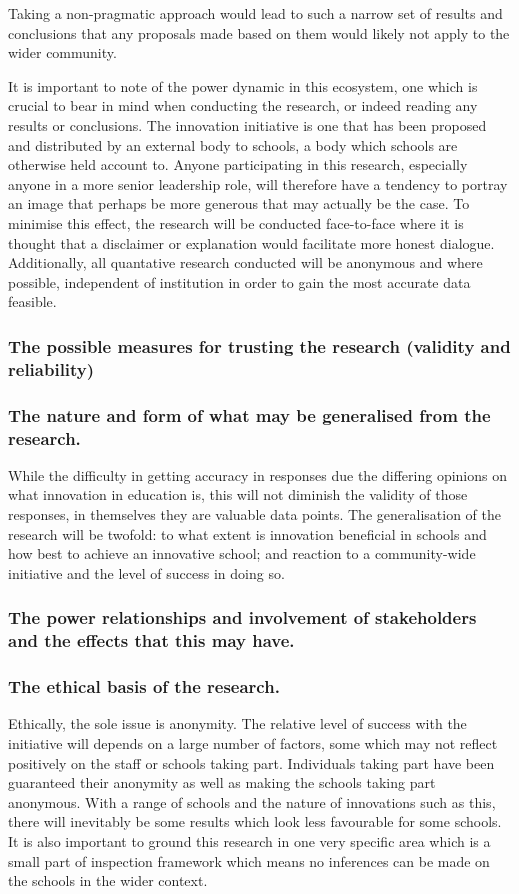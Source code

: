 Taking a non-pragmatic approach would lead to such a narrow set of results and conclusions that any proposals made based on them would likely not apply to the wider community. 

It is important to note of the power dynamic in this ecosystem, one which is crucial to bear in mind when conducting the research, or indeed reading any results or conclusions. The innovation initiative is one that has been proposed and distributed by an external body to schools, a body which schools are otherwise held account to. Anyone participating in this research, especially anyone in a more senior leadership role, will therefore have a tendency to portray an image that perhaps be more generous that may actually be the case. To minimise this effect, the research will be conducted face-to-face where it is thought that a disclaimer or explanation would facilitate more honest dialogue. Additionally, all quantative research conducted will be anonymous and where possible, independent of institution in order to gain the most accurate data feasible.

\subsubsection{The possible measures for trusting the research (validity and reliability)}
\subsubsection{The nature and form of what may be generalised from the research.}

While the difficulty in getting accuracy in responses due the differing opinions on what innovation in education is, this will not diminish the validity of those responses, in themselves they are valuable data points. The generalisation of the research will be twofold: to what extent is innovation beneficial in schools and how best to achieve an innovative school; and reaction to a community-wide initiative and the level of success in doing so.

\subsubsection{The power relationships and involvement of stakeholders and the effects that this may have.}
\subsubsection{The ethical basis of the research.}
Ethically, the sole issue is anonymity. The relative level of success with the initiative will depends on a large number of factors, some which may not reflect positively on the staff or schools taking part. Individuals taking part have been guaranteed their anonymity as well as making the schools taking part anonymous. With a range of schools and the nature of innovations such as this, there will inevitably be some results which look less favourable for some schools. It is also important to ground this research in one very specific area which is a small part of inspection framework which means no inferences can be made on the schools in the wider context.

